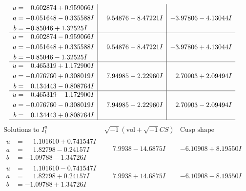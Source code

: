 \documentclass[1p]{elsarticle_modified}
\theoremstyle{definition}
\newcommand{\I}{\sqrt{-1}}
\begin{document}
$$\begin{array}{c|c|c}
\begin{aligned}
u &= \phantom{-}0.602874 + 0.959066 I \\
a &= -0.051648 - 0.335588 I \\
b &= -0.85046 + 1.32525 I\end{aligned}
 & \phantom{-}9.54876 + 8.47221 I & -3.97806 - 4.13044 I \\ \hline\begin{aligned}
u &= \phantom{-}0.602874 - 0.959066 I \\
a &= -0.051648 + 0.335588 I \\
b &= -0.85046 - 1.32525 I\end{aligned}
 & \phantom{-}9.54876 - 8.47221 I & -3.97806 + 4.13044 I \\ \hline\begin{aligned}
u &= \phantom{-}0.465319 + 1.172900 I \\
a &= -0.076760 + 0.308019 I \\
b &= \phantom{-}0.134443 - 0.808764 I\end{aligned}
 & \phantom{-}7.94985 - 2.22960 I & \phantom{-}2.70903 + 2.09494 I \\ \hline\begin{aligned}
u &= \phantom{-}0.465319 - 1.172900 I \\
a &= -0.076760 - 0.308019 I \\
b &= \phantom{-}0.134443 + 0.808764 I\end{aligned}
 & \phantom{-}7.94985 + 2.22960 I & \phantom{-}2.70903 - 2.09494 I\\
 \hline 
 \end{array}$$\newpage$$\begin{array}{c|c|c}  
\text{Solutions to }I^u_{1}& \I (\text{vol} + \sqrt{-1}CS) & \text{Cusp shape}\\
 \hline 
\begin{aligned}
u &= \phantom{-}1.101610 + 0.741547 I \\
a &= \phantom{-}1.82798 - 0.24157 I \\
b &= -1.09788 - 1.34726 I\end{aligned}
 & \phantom{-}7.9938 - 14.6875 I & -6.10908 + 8.19550 I \\ \hline\begin{aligned}
u &= \phantom{-}1.101610 - 0.741547 I \\
a &= \phantom{-}1.82798 + 0.24157 I \\
b &= -1.09788 + 1.34726 I\end{aligned}
 & \phantom{-}7.9938 + 14.6875 I & -6.10908 - 8.19550 I \\ \hline\begin{aligned}

\end{aligned}
\end{array}$$
\end{document}
